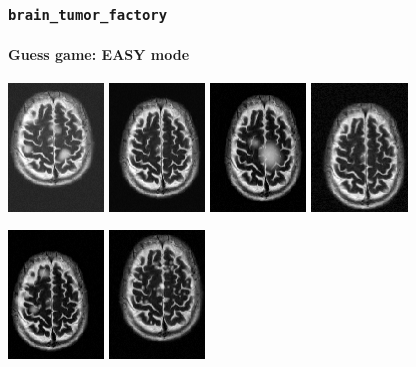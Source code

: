 \documentclass[]{beamer}
\newcommand{\btf}{\tt{brain\_tumor\_factory}}
\begin{document}
\begin{frame}
  \frametitle{\btf}
  \framesubtitle{Guess game: EASY mode}
  \begin{minipage}{\linewidth}
    \begin{center}
      \includegraphics[width=2.55cm]{resources/b2e}
      \includegraphics[width=2.55cm]{resources/z1e}
      \includegraphics[width=2.55cm]{resources/a2e}
      \includegraphics[width=2.55cm]{resources/z3e}
    \end{center}
  \end{minipage}
  \begin{minipage}{\linewidth}
    \begin{center}
      \includegraphics[width=2.55cm]{resources/b4e}
      \includegraphics[width=2.55cm]{resources/c2e}

\end{center}
\end{minipage}
\end{frame}
\end{document}
